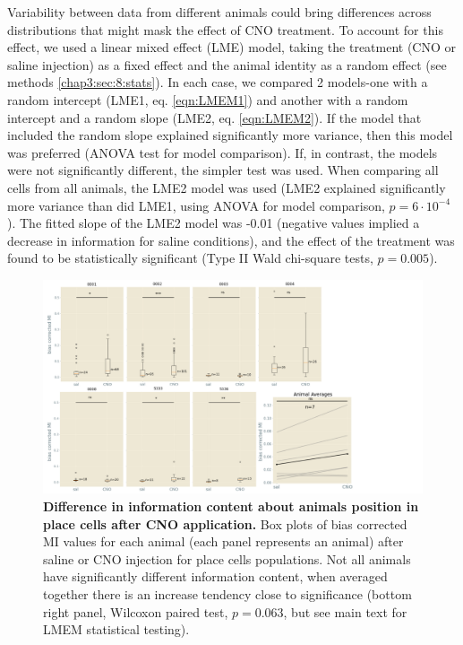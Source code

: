 Variability between data from different animals could bring differences across distributions that might mask the effect of CNO treatment.
To account for this effect, we used a linear mixed effect (LME) model, taking the treatment (CNO or saline injection) as a fixed effect and the animal identity as a random effect (see methods \ref{chap3:sec:8:stats}).
In each case, we compared 2 models-one with a random intercept (LME1, eq. \ref{eqn:LMEM1}) and another with a random intercept and a random slope (LME2, eq. \ref{eqn:LMEM2}). 
If the model that included the random slope explained significantly more variance, then this model was preferred (ANOVA test for model comparison).
If, in contrast, the models were not significantly different, the simpler test was used.
When comparing all cells from all animals, the LME2 model was used (LME2 explained significantly more variance than did LME1, using ANOVA for model comparison, $p=6\cdot 10^{-4}$).
The fitted slope of the LME2 model was -0.01 (negative values implied a decrease in information for saline conditions), and the effect of the treatment was found to be statistically significant (Type II Wald chi-square tests, $p=0.005$).
\begin{figure}[h!]
    \centering
    \includegraphics[trim={0 0 160 0}, clip, width=\textwidth]{Figures/Chapter4/MI_C_place_cells_2p.pdf}
    \caption[Difference in information content about animals position in place cells after CNO application]{\textbf{Difference in information content about animals position in place cells after CNO application.} 
    Box plots of bias corrected MI values for each animal (each panel represents an animal) after saline or CNO injection for place cells populations. 
    Not all animals have significantly different information content, when averaged together there is an increase tendency close to significance (bottom right panel, Wilcoxon paired test, $p = 0.063$, but see main text for LMEM statistical testing).}
    \label{fig:chap4:MI_C_PC_2p}
\end{figure}

